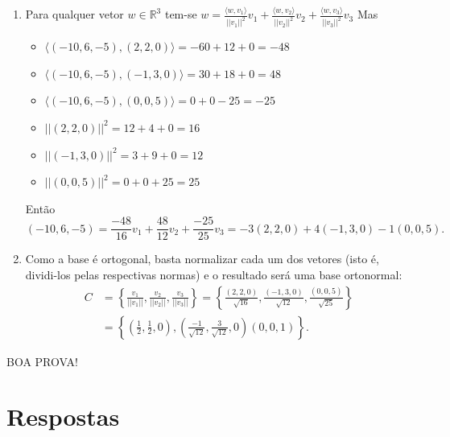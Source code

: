 \documentclass[12pt,a4paper]{article}
\newcommand{\norm}[1]{\left|\left|{#1}\right|\right|}
\newcommand*\R{\mathbb{R}}
\begin{document}
\begin{ExerciseList}
\begin{enumerate}
\item Para qualquer vetor $w \in \R^3$ tem-se $\displaystyle w = \frac{ \langle w, v_1\rangle }{ \norm{v_1}^2 } v_1
   +\frac{ \langle w, v_2\rangle }{ \norm{v_2}^2 } v_2
   +\frac{ \langle w, v_3\rangle }{ \norm{v_3}^2 } v_3
$
Mas
\begin{itemize}
\item $\langle (-10, 6, -5), (2,2,0)\rangle = -60 + 12 + 0 = -48$
\item $\langle (-10, 6, -5), (-1, 3, 0)\rangle = 30 + 18 + 0 = 48$
\item $\langle (-10, 6, -5), (0, 0, 5)\rangle = 0 + 0 - 25 = -25$
\item $\norm{ (2,2,0) }^2 = 12 + 4 + 0 = 16$
\item $\norm{ (-1,3,0) }^2 = 3 + 9 + 0 = 12$
\item $\norm{ (0,0,5) }^2 = 0 + 0 + 25 = 25$
\end{itemize}

Então
\[
(-10, 6, -5)
= \frac{ -48 }{ 16 } v_1
 +\frac{ 48 }{ 12 } v_2
 +\frac{ -25 }{ 25 } v_3
= -3 (2,2,0)
 + 4 (-1,3,0)
 - 1 (0,0,5).
 \]
\item Como a base é ortogonal, basta normalizar cada um dos vetores (isto é, dividi-los pelas respectivas normas) e o resultado será uma base ortonormal:
\begin{align*}
C
&= \left\{
\frac{v_1}{\norm{v_1}},
\frac{v_2}{\norm{v_2}},
\frac{v_3}{\norm{v_3}}
\right\}
= \left\{
\frac{(2,2,0)}{\sqrt{16}},
\frac{(-1,3,0)}{\sqrt{12}},
\frac{(0,0,5)}{\sqrt{25}}
\right\}\\
&= \left\{
\left(\frac{1}{2},\frac{1}{2},0\right),
\left(\frac{-1}{\sqrt{12}},\frac{3}{\sqrt{12}},0\right)
\left(0,0,1\right)
\right\}.
\end{align*}

\end{enumerate}
\end{ExerciseList}

\begin{center}
BOA PROVA!
\end{center}

\newpage
\restoregeometry
\section*{Respostas}
\shipoutAnswer
\end{document}
